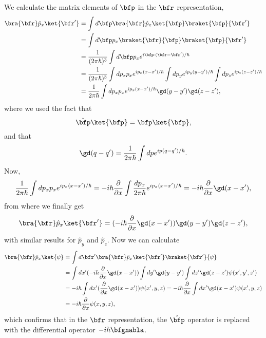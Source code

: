 We calculate the matrix elements of $\bfp$ in the $\bfr$
representation,
\begin{align}\label{ap_matp}
\bra{\bfr}\hat{p}_x\ket{\bfr'}&=
\int d\bfp
\bra{\bfr}\hat{p}_x\ket{\bfp}\braket{\bfp}{\bfr'} \\ \nonumber
&=
\int d\bfp
p_x\braket{\bfr}{\bfp}\braket{\bfp}{\bfr'} \\ \nonumber
&=
\frac{1}{(2\pi\hbar)^3}
\int d\bfp
p_x
e^{i\bfp\cdot(\bfr-\bfr')/\hbar}
\\ \nonumber
&=
\frac{1}{(2\pi\hbar)^3}
\int dp_x
p_x
e^{ip_x(x-x')/\hbar}
\int dp_y
e^{ip_y(y-y')/\hbar}
\int dp_z
e^{ip_z(z-z')/\hbar}
\\ \nonumber
&=
\frac{1}{2\pi\hbar}
\int dp_x
p_x
e^{ip_x(x-x')/\hbar}
\gd(y-y')
\gd(z-z')
,
\end{align}
where we used the fact that
\begin{equation}\label{ap_otra}
\hat\bfp\ket{\bfp}=\bfp\ket{\bfp}
,
\end{equation}
and that
\begin{equation}\label{ap_delta}
\gd(q-q')=\frac{1}{2\pi\hbar}
\int dp
e^{ip(q-q')/\hbar}
.
\end{equation}
Now,
\begin{equation}\label{ap_mas}
\frac{1}{2\pi\hbar}
\int dp_x
p_x
e^{ip_x(x-x')/\hbar}
=
-i\hbar\frac{\partial}{\partial x}
\int
\frac{dp_x}{2\pi\hbar}
e^{ip_x(x-x')/\hbar}
=-i\hbar\frac{\partial}{\partial x}\gd(x-x')
,
\end{equation}
from where we finally get 
\begin{equation}\label{ap_fin}
\bra{\bfr}\hat{p}_x\ket{\bfr'}=
(-i\hbar\frac{\partial}{\partial x}\gd(x-x'))
\gd(y-y')
\gd(z-z')
,
\end{equation}
with similar results for $\hat{p}_y$ and $\hat{p}_z$.
Now we can calculate
\begin{align}\label{ap_psi}
\bra{\bfr}\hat{p}_x\ket{\psi}&=
\int d\bfr' \bra{\bfr}\hat{p}_x\ket{\bfr'}\braket{\bfr'}{\psi}
\\ \nonumber
&=
\int dx' (-i\hbar\frac{\partial}{\partial x}\gd(x-x'))
\int dy' \gd(y-y')
\int dz' \gd(z-z')
\psi(x',y',z')
\\ \nonumber
&=
-i\hbar
\int dx' (\frac{\partial}{\partial x}\gd(x-x'))
\psi(x',y,z)
=
-i\hbar
\frac{\partial}{\partial x}
\int dx' 
\gd(x-x')
\psi(x',y,z)
\\ \nonumber
&=
-i\hbar
\frac{\partial}{\partial x}
\psi(x,y,z)
,
\end{align}
which confirms that in the $\bfr$ representation,
the $\hat\bfp$ operator is replaced with the differential operator
$-i\hbar\bfgnabla$. 
